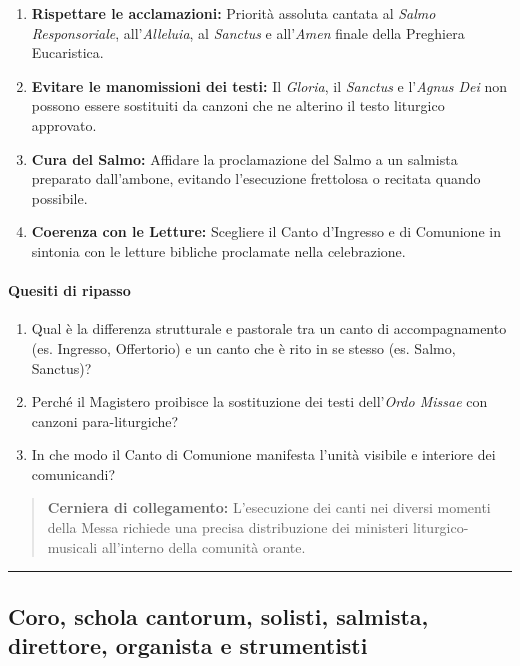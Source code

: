 \documentclass[12pt,a4paper]{article}
\begin{document}
	\begin{enumerate}[label=\arabic*.,leftmargin=*]
		\item \textbf{Rispettare le acclamazioni:} Priorità assoluta cantata al \emph{Salmo Responsoriale}, all'\emph{Alleluia}, al \emph{Sanctus} e all'\emph{Amen} finale della Preghiera Eucaristica.
		\item \textbf{Evitare le manomissioni dei testi:} Il \emph{Gloria}, il \emph{Sanctus} e l'\emph{Agnus Dei} non possono essere sostituiti da canzoni che ne alterino il testo liturgico approvato.
		\item \textbf{Cura del Salmo:} Affidare la proclamazione del Salmo a un salmista preparato dall'ambone, evitando l'esecuzione frettolosa o recitata quando possibile.
		\item \textbf{Coerenza con le Letture:} Scegliere il Canto d'Ingresso e di Comunione in sintonia con le letture bibliche proclamate nella celebrazione.
	\end{enumerate}
	
	\paragraph{Quesiti di ripasso}\label{quesiti-di-ripasso-1}
	
	\begin{enumerate}[label=\arabic*.,leftmargin=*]
		\item Qual è la differenza strutturale e pastorale tra un canto di accompagnamento (es. Ingresso, Offertorio) e un canto che è rito in se stesso (es. Salmo, Sanctus)?
		\item Perché il Magistero proibisce la sostituzione dei testi dell'\emph{Ordo Missae} con canzoni para-liturgiche?
		\item In che modo il Canto di Comunione manifesta l'unità visibile e interiore dei comunicandi?
	\end{enumerate}
	
	\begin{quote}
		\textbf{Cerniera di collegamento:} L'esecuzione dei canti nei diversi momenti della Messa richiede una precisa distribuzione dei ministeri liturgico-musicali all'interno della comunità orante.
	\end{quote}
	
	\begin{center}\rule{0.5\linewidth}{0.5pt}\end{center}
	
	\subsection{Coro, schola cantorum, solisti, salmista, direttore, organista e strumentisti}\label{coro-schola-cantorum-solisti-salmista-direttore-organista-e-strumentisti}
	
\end{document}
